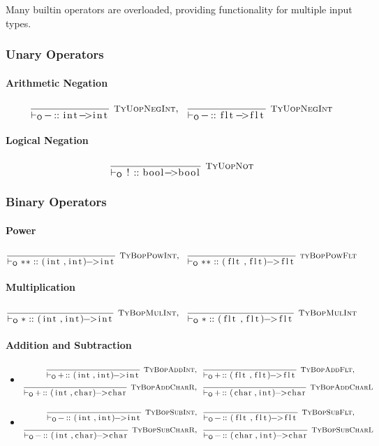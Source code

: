 \documentclass{article}
\newcommand{\code}[1]{\lstinline[columns=fixed]{#1}}
\newcommand{\drmrule}[5]{\frac{#1}{#2\vdash_{\mathsf{#3}}#4}\textsc{\ \small{#5}}}
\newcommand{\mc}[1]{\textnormal{\code{#1}}}
\newcommand{\subsubsubsection}{\paragraph}
\begin{document}
			Many builtin operators are overloaded, providing functionality for multiple input types.
			
			\subsubsection{Unary Operators}
			
				\subsubsubsection{Arithmetic Negation}
				
					\begin{align*}
						\drmrule{}{}{O}{\mc{-} :: \mc{int->int}}{TyUopNegInt},\ \ 
						\drmrule{}{}{O}{\mc{-} :: \mc{flt->flt}}{TyUopNegInt}
					\end{align*}
				
				\subsubsubsection{Logical Negation}

					\begin{align*}
						\drmrule{}{}{O}{\mc{!} :: \mc{bool->bool}}{TyUopNot}
					\end{align*}
			
			\subsubsection{Binary Operators}
			
				\subsubsubsection{Power}
				
					\begin{align*}
						\drmrule{}{}{O}{\mc{**} :: \mc{(int,int)->int}}{TyBopPowInt},\ \ 
						\drmrule{}{}{O}{\mc{**} :: \mc{(flt,flt)->flt}}{tyBopPowFlt}
					\end{align*}
				
				\subsubsubsection{Multiplication}
				
					\begin{align*}
						\drmrule{}{}{O}{\mc{*} :: \mc{(int,int)->int}}{TyBopMulInt},\ \ 
						\drmrule{}{}{O}{\mc{*} :: \mc{(flt,flt)->flt}}{TyBopMulInt}
					\end{align*}
				
				\subsubsubsection{Addition and Subtraction}
				
					\begin{itemize}
						\item
							\begin{align*}
								\drmrule{}{}{O}{\mc{+} :: \mc{(int,int)->int}}{TyBopAddInt},\ \ &
								\drmrule{}{}{O}{\mc{+} :: \mc{(flt,flt)->flt}}{TyBopAddFlt},\\
								\drmrule{}{}{O}{\mc{+} :: \mc{(int,char)->char}}{TyBopAddCharR},\ \ &
								\drmrule{}{}{O}{\mc{+} :: \mc{(char,int)->char}}{TyBopAddCharL}
							\end{align*}
						\item
							\begin{align*}
								\drmrule{}{}{O}{\mc{-} :: \mc{(int,int)->int}}{TyBopSubInt},\ \ &
								\drmrule{}{}{O}{\mc{-} :: \mc{(flt,flt)->flt}}{TyBopSubFlt},\\
								\drmrule{}{}{O}{\mc{-} :: \mc{(int,char)->char}}{TyBopSubCharR},\ \ &
								\drmrule{}{}{O}{\mc{-} :: \mc{(char,int)->char}}{TyBopSubCharL}
							\end{align*}
					\end{itemize}
				
\end{document}
